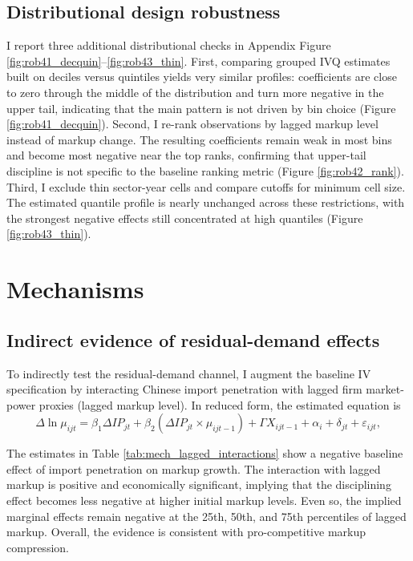 \documentclass[12pt]{article}
\begin{document}
\subsection{Distributional design robustness}
I report three additional distributional checks in Appendix Figure \ref{fig:rob41_decquin}--\ref{fig:rob43_thin}. First, comparing grouped IVQ estimates built on deciles versus quintiles yields very similar profiles: coefficients are close to zero through the middle of the distribution and turn more negative in the upper tail, indicating that the main pattern is not driven by bin choice (Figure \ref{fig:rob41_decquin}). Second, I re-rank observations by lagged markup level instead of markup change. The resulting coefficients remain weak in most bins and become most negative near the top ranks, confirming that upper-tail discipline is not specific to the baseline ranking metric (Figure \ref{fig:rob42_rank}). Third, I exclude thin sector-year cells and compare cutoffs for minimum cell size. The estimated quantile profile is nearly unchanged across these restrictions, with the strongest negative effects still concentrated at high quantiles (Figure \ref{fig:rob43_thin}).


\section{Mechanisms}

\subsection{Indirect evidence of residual-demand effects}
To indirectly test the residual-demand channel, I augment the baseline IV specification by interacting Chinese import penetration with lagged firm market-power proxies (lagged markup level). In reduced form, the estimated equation is
\[
\Delta \ln \mu_{ijt} = \beta_1 \Delta IP_{jt} + \beta_2 (\Delta IP_{jt} \times \mu_{ijt-1}) + \Gamma X_{ijt-1} + \alpha_i + \delta_{jt} + \varepsilon_{ijt},
\]

The estimates in Table \ref{tab:mech_lagged_interactions} show a negative baseline effect of import penetration on markup growth. The interaction with lagged markup is positive and economically significant, implying that the disciplining effect becomes less negative at higher initial markup levels. Even so, the implied marginal effects remain negative at the 25th, 50th, and 75th percentiles of lagged markup. Overall, the evidence is consistent with pro-competitive markup compression.
\end{document}
